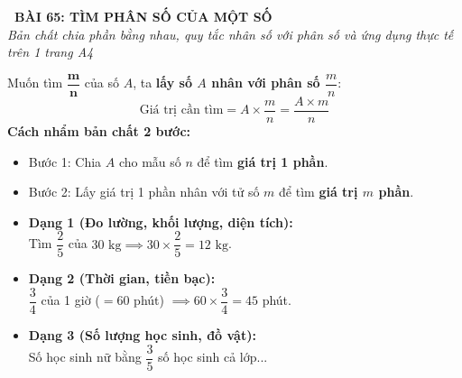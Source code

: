 \documentclass[14pt,a4paper,oneside]{extbook}
\begin{document}
\noindent
\begin{tcolorbox}[
  enhanced,
  colback=teal!8!white,
  colframe=teal!80!black,
  arc=3mm, boxrule=1pt,
  left=3mm, right=3mm, top=2mm, bottom=2mm,
  halign=center
]
  {\Large\bfseries\color{teal!90!black}\faBookmark\ BÀI 65: TÌM PHÂN SỐ CỦA MỘT SỐ}\\[1.5pt]
  {\footnotesize\itshape\color{black!75} Bản chất chia phần bằng nhau, quy tắc nhân số với phân số và ứng dụng thực tế trên 1 trang A4}
\end{tcolorbox}

\vspace{-2.5mm}

\noindent
\begin{minipage}[t]{0.49\textwidth}\vspace{0pt}
\begin{tcolorbox}[
  enhanced,
  colback=blue!4!white,
  colframe=blue!75!black,
  arc=2mm, boxrule=0.8pt,
  left=2mm, right=2mm, top=1.8mm, bottom=1.8mm,
  title={\footnotesize\bfseries\color{white}\faCalculator\ 1. Quy tắc cốt lõi}
]
{\footnotesize
Muốn tìm $\mathbf{\dfrac{m}{n}}$ của số $A$, ta \textbf{lấy số $A$ nhân với phân số $\dfrac{m}{n}$}:
$$\text{Giá trị cần tìm} = A \times \dfrac{m}{n} = \dfrac{A \times m}{n}$$
\textbf{Cách nhẩm bản chất 2 bước:}
\begin{itemize}\setlength{\itemsep}{1pt}\setlength{\leftskip}{-2.5mm}
  \item Bước 1: Chia $A$ cho mẫu số $n$ để tìm \textbf{giá trị 1 phần}.
  \item Bước 2: Lấy giá trị 1 phần nhân với tử số $m$ để tìm \textbf{giá trị $m$ phần}.
\end{itemize}
}
\end{tcolorbox}
\end{minipage}
\hfill
\begin{minipage}[t]{0.49\textwidth}\vspace{0pt}
\begin{tcolorbox}[
  enhanced,
  colback=teal!4!white,
  colframe=teal!75!black,
  arc=2mm, boxrule=0.8pt,
  left=2mm, right=2mm, top=1.8mm, bottom=1.8mm,
  title={\footnotesize\bfseries\color{white}\faTags\ 2. Các dạng toán điển hình}
]
{\footnotesize
\begin{itemize}\setlength{\itemsep}{1.5pt}\setlength{\leftskip}{-2.5mm}
  \item \textbf{Dạng 1 (Đo lường, khối lượng, diện tích):}\\
  Tìm $\dfrac{2}{5}$ của $30\text{ kg} \implies 30 \times \dfrac{2}{5} = 12\text{ kg}$.
  \item \textbf{Dạng 2 (Thời gian, tiền bạc):}\\
  $\dfrac{3}{4}$ của 1 giờ ($=60$ phút) $\implies 60 \times \dfrac{3}{4} = 45$ phút.
  \item \textbf{Dạng 3 (Số lượng học sinh, đồ vật):}\\
  Số học sinh nữ bằng $\dfrac{3}{5}$ số học sinh cả lớp...
\end{itemize}
}
\end{tcolorbox}
\end{minipage}
\end{document}
